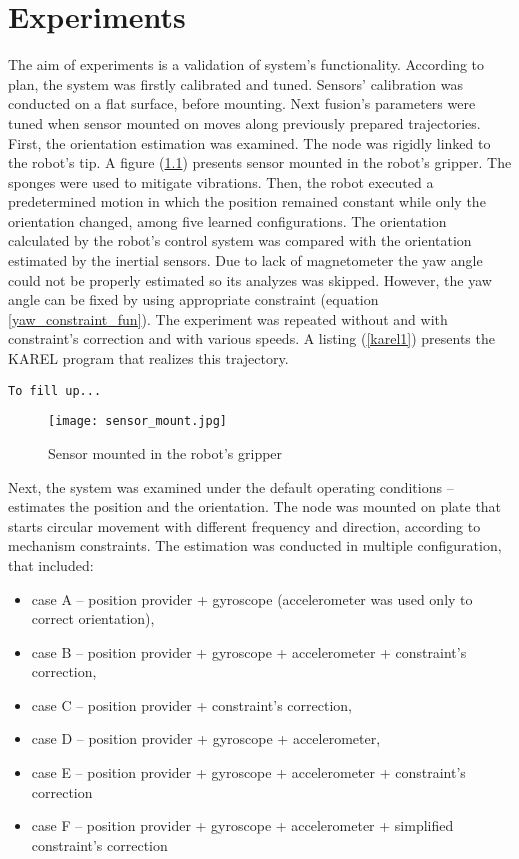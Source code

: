 \chapter{Experiments}

The aim of experiments is a validation of system's functionality. According to plan, the system was firstly calibrated and tuned. Sensors' calibration was conducted on a flat surface, before mounting. Next fusion's parameters were tuned when sensor mounted on moves along previously prepared trajectories.\\

 First, the orientation estimation was examined. The node was rigidly linked to the robot's tip. A figure (\ref{sensor_mount}) presents sensor mounted in the robot's gripper. The sponges were used to mitigate vibrations.  Then, the robot executed a predetermined motion in which the position remained constant while only the orientation changed, among five learned configurations. The orientation calculated by the robot's control system was compared with the orientation estimated by the inertial sensors. Due to lack of magnetometer the yaw angle could not be properly estimated so its analyzes was skipped. However, the yaw angle can be fixed by using appropriate constraint (equation \ref{yaw_constraint_fun}). The experiment was repeated without and with constraint's correction and with various speeds. A listing (\ref{karel1}) presents the KAREL program that realizes this trajectory.
 
 \begin{lstlisting}[caption={The KAREL program realizing an orientation changes}, captionpos=b, label=karel1]
 	To fill up...
 \end{lstlisting}
 
\begin{figure}[!h]
	\centering
	\texttt{[image: sensor\_mount.jpg]}
	\caption{Sensor mounted in the robot's gripper}
	\label{sensor_mount}
\end{figure}

 Next, the system was examined under the default operating conditions -- estimates the position and the orientation. The node was mounted on plate that starts circular movement with different frequency and direction, according to mechanism constraints. The estimation was conducted in multiple configuration, that included:
\begin{itemize}
	\item case A -- position provider + gyroscope (accelerometer was used only to correct orientation),
	\item case B -- position provider + gyroscope + accelerometer + constraint's correction,
	\item case C -- position provider + constraint's correction,
	\item case D -- position provider + gyroscope + accelerometer,
	\item case E -- position provider + gyroscope + accelerometer + constraint's correction
	\item case F -- position provider + gyroscope + accelerometer + simplified constraint's correction
\end{itemize}


